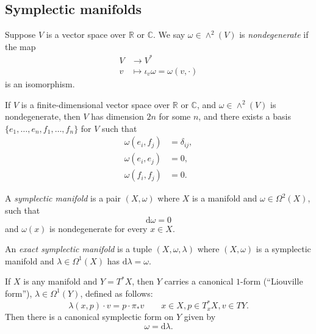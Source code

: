 \documentclass[12pt,letterpaper,reqno]{article}
\numberwithin{equation}{section}
\newcommand{\R}{\ensuremath{\mathbb R}}
\newcommand{\C}{\ensuremath{\mathbb C}}
\newcommand{\de}{\mathrm{d}}
\newcommand{\ti}[1]{\textit{#1}}
\begin{document}
\subsection{Symplectic manifolds}

\begin{defn} \label{def:nondegenerate-skew-pairing}
Suppose $V$ is a vector space over $\R$ or $\C$.
We say $\omega \in \wedge^2(V)$ is \ti{nondegenerate}
if the map
\begin{align}
  V &\to V^* \\
  v &\mapsto \iota_v \omega = \omega(v,\cdot)
\end{align}
is an isomorphism.
\end{defn}

\begin{prop}
\label{prop:standard-nondegenerate-skew-pairing}
If $V$ is a finite-dimensional vector space over $\R$ or $\C$, and
$\omega \in \wedge^2(V)$ is nondegenerate, then $V$ has
dimension $2n$ for some $n$, and there
exists a basis $\{e_1, \dots, e_n, f_1, \dots, f_n\}$ for $V$
such that
\begin{align}
\omega(e_i, f_j) &= \delta_{ij}, \\
\omega(e_i, e_j) &= 0, \\
\omega(f_i, f_j) &= 0.
\end{align}
\end{prop}

\begin{defn} \label{def:symplectic-manifold}
A \ti{symplectic manifold} is a pair $(X,\omega)$
where $X$ is a manifold and
$\omega \in \Omega^2(X)$, such that
\begin{equation}
  \de \omega = 0
\end{equation}
and $\omega(x)$ is nondegenerate for every $x \in X$.
\end{defn}

\begin{defn}
An \ti{exact symplectic manifold} is a tuple $(X,\omega,\lambda)$
where $(X,\omega)$ is a symplectic manifold and $\lambda \in \Omega^1(X)$ has $\de \lambda = \omega$.
\end{defn}

\begin{example}
If $X$ is any manifold and $Y = T^* X$, then $Y$ carries a canonical
$1$-form (``Liouville form''), $\lambda \in \Omega^1(Y)$,
defined as follows:
\begin{equation}
  \lambda(x,p) \cdot v = p \cdot \pi_* v \qquad x \in X, p \in T^*_x X, v \in TY.
\end{equation}
Then there is a canonical symplectic form on $Y$ given by
\begin{equation}
\omega = \de \lambda.
\end{equation}
\end{example}
\end{document}
